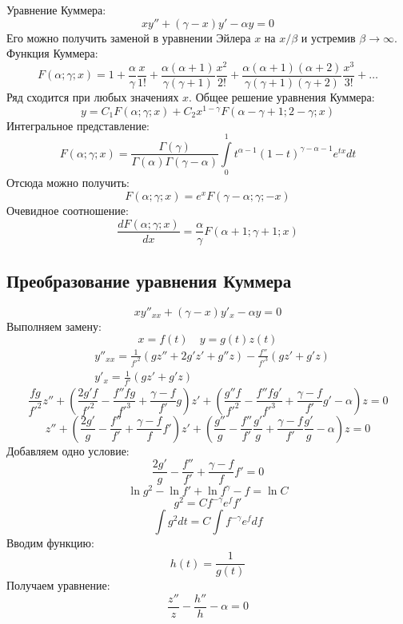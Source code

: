 Уравнение Куммера:
\[
	x y'' + (\gamma - x) y' - \alpha y = 0
\]
Его можно получить заменой в уравнении Эйлера $x$ на $x/\beta$ и устремив $\beta \to \infty$. Функция Куммера:
\[
	F(\alpha; \gamma; x) = 1+
	\frac{\alpha}{\gamma} \frac{x}{1!} + 
	\frac{\alpha(\alpha + 1)}{\gamma (\gamma + 1)} \frac{x^2}{2!} +
	\frac{\alpha(\alpha + 1)(\alpha + 2)}{\gamma (\gamma + 1)(\gamma + 2)} \frac{x^3}{3!} +
	\ldots
\]
Ряд сходится при любых значениях $x$. Общее решение уравнения Куммера:
\[
	y = C_1 F(\alpha; \gamma; x) + C_2 x^{1 - \gamma} F(\alpha - \gamma + 1; 2 - \gamma; x)
\]
Интегральное представление:
\[
	F(\alpha; \gamma; x) = 
	\frac{\Gamma(\gamma)}{\Gamma(\alpha) \Gamma(\gamma - \alpha)}
	\int\limits_0^1 t^{\alpha-1}(1 - t)^{\gamma - \alpha - 1} e^{tx} dt
\]
Отсюда можно получить:
\[
	F(\alpha; \gamma; x) = 
	e^x F(\gamma - \alpha; \gamma; -x) 
\]
Очевидное соотношение:
\[
	\frac{d F(\alpha; \gamma; x)}{dx} = \frac{\alpha}{\gamma} F(\alpha + 1; \gamma + 1; x)
\]

\subsection{Преобразование уравнения Куммера}

\[
	x y''_{xx} + (\gamma - x) y'_x - \alpha y = 0
\]
Выполняем замену:
\[
	x = f(t) \quad y = g(t) z(t)
\]
\[
	\begin{aligned}
	& y''_{xx} = \frac{1}{f'^2} (g z'' + 2 g' z' + g'' z) - \frac{f''}{f'^3} (gz' + g'z)
	\\
	& y'_x = \frac{1}{f'} (gz' + g'z)
	\end{aligned}
\]
\[
	\frac{f g}{f'^2} z'' +
	\left(
		\frac{2 g' f}{f'^2} - \frac{f'' f g}{f'^3}  +\frac{\gamma - f}{f'} g 
	\right) z' +
	\left(
	\frac{g'' f}{f'^2} - \frac{f'' f g'}{f'^3}  +\frac{\gamma - f}{f'} g' - \alpha
	\right) z = 0
\]
\[
	z'' +
	\left(
	\frac{2 g'}{g} - \frac{f''}{f'}  +\frac{\gamma - f}{f} f' 
	\right) z' +
	\left(
	\frac{g''}{g} - \frac{f''}{f'} \frac{g'}{g} +\frac{\gamma - f}{f'} \frac{g'}{g}  - \alpha
	\right) z = 0
\]
Добавляем одно условие:
\[
	\frac{2 g'}{g} - \frac{f''}{f'}  +\frac{\gamma - f}{f} f' = 0
\]
\[
	\ln g^2 - \ln f'  + \ln f^\gamma - f = \ln C
\]
\[
	g^2 = C f^{-\gamma} e^{f} f'
\]
\[
	\int g^2 dt = C \int f^{-\gamma} e^{f} df
\]
Вводим функцию:
\[
	h(t) = \frac{1}{g(t)}
\]
Получаем уравнение:
\[
	\frac{z''}{z} - 
	\frac{h''}{h} - \alpha
	= 0	
\]